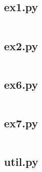 \documentclass[10pt,a4paper,twoside,twocolumn]{article}
\begin{document}
\subsection{ex1.py}\label{s}
\inputminted{python}{../src/ex1.py}

\subsection{ex2.py}
\inputminted{python}{../src/ex2.py}

\subsection{ex6.py}
\inputminted{python}{../src/ex6.py}

\subsection{ex7.py}
\inputminted{python}{../src/ex7.py}

\subsection{util.py}
\inputminted{python}{../src/util.py}
\end{document}
